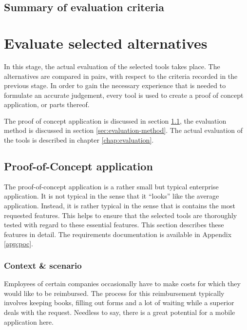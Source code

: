 
\subsection{Summary of evaluation criteria}

\section{Evaluate selected alternatives}


In this stage, the actual evaluation of the selected tools takes place. The alternatives are compared in pairs, with respect to the criteria recorded in the previous stage. In order to gain the necessary experience that is needed to formulate an accurate judgement, every tool is used to create a proof of concept application, or parts thereof.

The proof of concept application is discussed in section \ref{sec:poc}, the evaluation method is discussed in section \ref{sec:evaluation-method}. The actual evaluation of the tools is described in chapter \ref{chap:evaluation}.

\subsection{Proof-of-Concept application}
\label{sec:poc}

The proof-of-concept application is a rather small but typical enterprise application. It is not typical in the sense that it ``looks'' like the average application. Instead, it is rather typical in the sense that is contains the most requested features. This helps to ensure that the selected tools are thoroughly tested with regard to these essential features. This section describes these features in detail. The requirements documentation is available in Appendix \ref{app:poc}.

\subsubsection{Context \& scenario}

Employees of certain companies occasionally have to make costs for which they would like to be reimbursed. The process for this reimbursement typically involves keeping books, filling out forms and a lot of waiting while a superior deals with the request. Needless to say, there is a great potential for a mobile application here.

